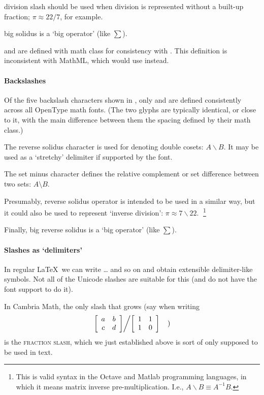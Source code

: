  {division slash} should be used when division is represented
without a built-up fraction; $\pi\approx22/7$, for example.

 {big solidus} is a `big operator' (like $\sum$).

 and  are defined with math class  for consistency with .
This definition is inconsistent with MathML, which would use  instead.

\paragraph{Backslashes}

Of the five backslash characters shown in , only  and  are defined consistently across all OpenType math fonts.
(The two glyphs are typically identical, or close to it, with the main difference between them the spacing defined by their math class.)

The  {reverse solidus} character  is used for denoting
double cosets: $A\backslash B$. It may be used as a `stretchy' delimiter if supported by the font.

The  {set minus} character  defines the relative complement or set difference between two sets: $A\setminus B$.

Presumably,  {reverse solidus operator} is intended to
be used in a similar way, but it could also be used to
represent `inverse division': $\pi\approx7\mathbin{\backslash}22$.^^A
\footnote{This is valid syntax in the Octave and Matlab programming languages,
in which it means matrix inverse pre-multiplication. I.e., $A\mathbin{\backslash} B\equiv A^{-1}B$.}

Finally,  {big reverse solidus} is a `big operator' (like $\sum$).

\paragraph{Slashes as `delimiters'}

In regular \LaTeX\ we can write \dots{}
and so on and obtain extensible delimiter-like symbols. Not all of the Unicode slashes
are suitable for this (and do not have the font support to do it).

In Cambria Math, the only slash that grows (say when writing
\[
\left.\left[\begin{array}{cc} a & b \\ c & d\end{array}\right]\middle\slash
      \left[\begin{array}{cc} 1 & 1 \\ 1 & 0\end{array}\right] \right.\quad )
\]
is the \textsc{fraction slash}, which we just established above is
sort of only supposed to be used in text.

